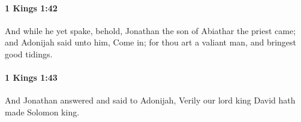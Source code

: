 		\paragraph{1 Kings 1:42} %
			\label{1KINGS-1-42}

			And while he yet spake, behold, Jonathan the son of Abiathar the priest came; and Adonijah said unto him, Come in; for thou art a valiant man, and bringest good tidings.


		\paragraph{1 Kings 1:43} %
			\label{1KINGS-1-43}

			And Jonathan answered and said to Adonijah, Verily our lord king David hath made Solomon king.


